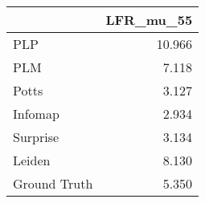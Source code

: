 \begin{tabular}{lr}
\toprule
{} & LFR_mu_55 \\
\midrule
PLP          &    10.966 \\
PLM          &     7.118 \\
Potts        &     3.127 \\
Infomap      &     2.934 \\
Surprise     &     3.134 \\
Leiden       &     8.130 \\
Ground Truth &     5.350 \\
\bottomrule
\end{tabular}
